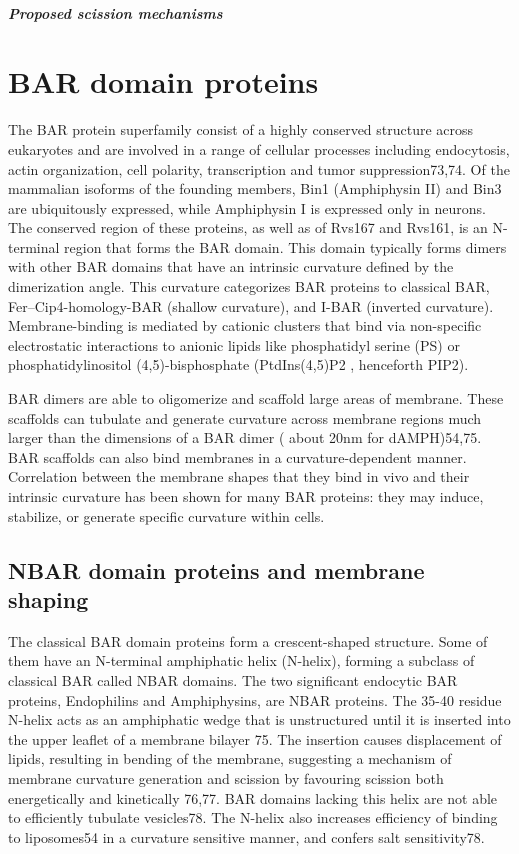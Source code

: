 			\subparagraph{Proposed scission mechanisms}

		
\section{BAR domain proteins}
	
The BAR protein superfamily consist of a highly conserved structure across eukaryotes and are involved in a range of cellular processes including endocytosis, actin organization, cell polarity, transcription and tumor suppression73,74.
Of the mammalian isoforms of the founding members, Bin1 (Amphiphysin II) and Bin3 are ubiquitously expressed, while Amphiphysin I is expressed only in neurons. The conserved region of these proteins, as well as of Rvs167 and Rvs161, is an N-terminal region that forms the BAR domain. This domain typically forms dimers with other BAR domains that have an intrinsic curvature defined by the dimerization angle. This curvature categorizes BAR proteins to classical BAR, Fer–Cip4-homology-BAR (shallow curvature), and I-BAR (inverted curvature). Membrane-binding is mediated by cationic clusters that bind via non-specific electrostatic interactions to anionic lipids like phosphatidyl serine (PS) or phosphatidylinositol (4,5)-bisphosphate (PtdIns(4,5)P2 , henceforth PIP2).

\vspace{5mm}
BAR dimers are able to oligomerize and scaffold large areas of membrane. These scaffolds can tubulate and generate curvature across membrane regions much larger than the dimensions of a BAR dimer ( about 20nm for dAMPH)54,75. BAR scaffolds can also bind membranes in a curvature-dependent manner. Correlation between the membrane shapes that they bind in vivo and their intrinsic curvature has been shown for many BAR proteins: they may induce, stabilize, or generate specific curvature within cells. 


	\subsection{NBAR domain proteins and membrane shaping}	
	The classical BAR domain proteins form a crescent-shaped structure. Some of them have an N-terminal amphiphatic helix (N-helix), forming a subclass of classical BAR called NBAR domains. The two significant endocytic BAR proteins, Endophilins and Amphiphysins, are NBAR proteins. The 35-40 residue N-helix acts as an amphiphatic wedge that is unstructured until it is inserted into the upper leaflet of a membrane bilayer 75. The insertion causes displacement of lipids, resulting in bending of the membrane, suggesting a mechanism of membrane curvature generation and scission by favouring scission both energetically and kinetically 76,77. BAR domains lacking this helix are not able to efficiently tubulate vesicles78. The N-helix also increases efficiency of binding to liposomes54 in a curvature sensitive manner, and confers salt sensitivity78. 

